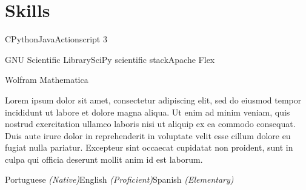 
\section{Skills}

\begin{cvrows}[J]
	{C\dotsep Python\dotsep Java\dotsep Actionscript 3}
	
	{GNU Scientific Library\dotsep SciPy scientific stack\dotsep Apache Flex}
	
	{Wolfram Mathematica}
	
	{Lorem ipsum dolor sit amet, consectetur adipiscing elit, sed do eiusmod tempor incididunt ut labore et dolore magna aliqua. Ut enim ad minim veniam, quis nostrud exercitation ullamco laboris nisi ut aliquip ex ea commodo consequat. Duis aute irure dolor in reprehenderit in voluptate velit esse cillum dolore eu fugiat nulla pariatur. Excepteur sint occaecat cupidatat non proident, sunt in culpa qui officia deserunt mollit anim id est laborum.
	}
	
	{Portuguese \textit{(Native)}\dotsep English \textit{(Proficient)}\dotsep Spanish \textit{(Elementary)}}
	
\end{cvrows}


\clearsection
